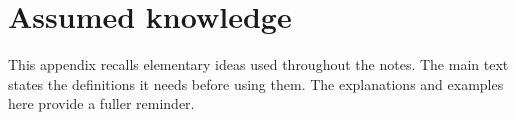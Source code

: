 \chapter{Assumed knowledge}
\label{ch:appendix:assumed-knowledge}

This appendix recalls elementary ideas used throughout the notes.
The main text states the definitions it needs before using them. The
explanations and examples here provide a fuller reminder.



